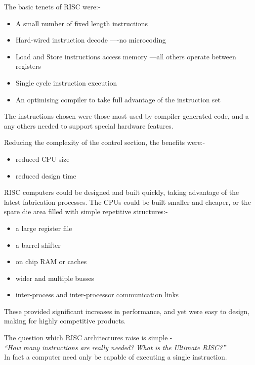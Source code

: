 {\samepage
The basic tenets of RISC were:-
\begin{itemize}
\item
A small number of fixed length instructions 
\item
Hard-wired instruction decode ----no microcoding
\item
Load and Store  instructions access memory ---all others operate between registers
\item
Single cycle instruction execution
\item An optimising compiler to take full advantage of the instruction set 
\end{itemize}
The instructions  chosen were those most used by  compiler  generated code, and a any others needed to support special hardware features.
}

 Reducing the complexity of the control section, the benefits were:-
\begin{itemize}
\item reduced CPU size
\item reduced design time
\end{itemize}
RISC computers could be designed and built quickly, taking advantage of the latest fabrication processes. The CPUs could be built smaller and  cheaper, or the spare die area  filled with simple repetitive structures:-

\begin{itemize}
\item a large register file
\item a barrel shifter
\item on chip RAM or caches
\item wider and multiple busses
\item inter-process and inter-processor communication links
\end{itemize}

These  provided significant increases in performance, and yet were easy to design, making for highly competitive products.

The question which RISC architectures raise is simple -\\
{\em ``How many instructions are really needed? What is the Ultimate RISC?''}\\
In fact a computer need only be capable of executing a single instruction.
